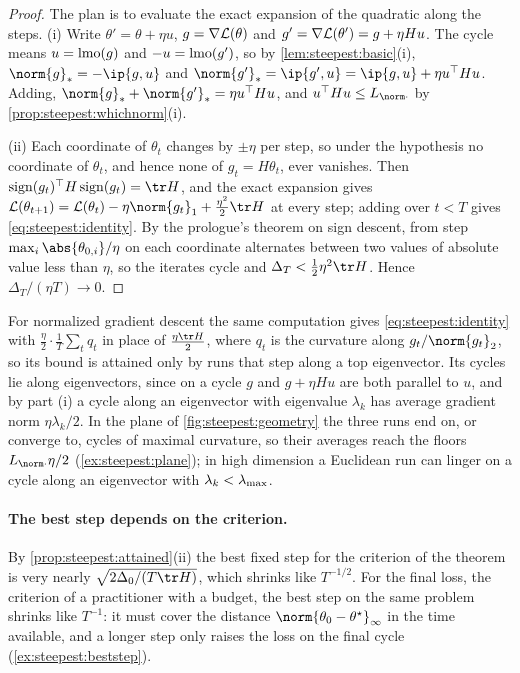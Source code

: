 \begin{refsection}
\begin{proof}
The plan is to evaluate the exact expansion of the quadratic along the steps. (i) Write $\theta'=\theta+\eta u$, $g=\nabla\mathcal{L}(\theta)$ and $g'=\nabla\mathcal{L}(\theta')=g+\eta Hu$. The cycle means $u=\operatorname{lmo}(g)$ and $-u=\operatorname{lmo}(g')$, so by \cref{lem:steepest:basic}(i), $\norm{g}_*=-\ip{g,u}$ and $\norm{g'}_*=\ip{g',u}=\ip{g,u}+\eta u^\top Hu$. Adding, $\norm{g}_*+\norm{g'}_*=\eta u^\top Hu$, and $u^\top Hu\le L_{\norm\cdot}$ by \cref{prop:steepest:whichnorm}(i).

(ii) Each coordinate of $\theta_t$ changes by $\pm\eta$ per step, so under the hypothesis no coordinate of $\theta_t$, and hence none of $g_t=H\theta_t$, ever vanishes. Then $\sign(g_t)^\top H\sign(g_t)=\tr H$, and the exact expansion gives $\Loss(\theta_{t+1})=\Loss(\theta_t)-\eta\norm{g_t}_1+\frac{\eta^2}2\tr H$ at every step; adding over $t<T$ gives \eqref{eq:steepest:identity}. By the prologue's theorem on sign descent, from step $\max_i\abs{\theta_{0,i}}/\eta$ on each coordinate alternates between two values of absolute value less than $\eta$, so the iterates cycle and $\Delta_T<\frac12\eta^2\tr H$. Hence $\Delta_T/(\eta T)\to0$.
\end{proof}

For normalized gradient descent the same computation gives \eqref{eq:steepest:identity} with $\frac\eta2\cdot\frac1T\sum_tq_t$ in place of $\frac{\eta\tr H}2$, where $q_t$ is the curvature along $g_t/\norm{g_t}_2$, so its bound is attained only by runs that step along a top eigenvector. Its cycles lie along eigenvectors, since on a cycle $g$ and $g+\eta Hu$ are both parallel to $u$, and by part (i) a cycle along an eigenvector with eigenvalue $\lambda_k$ has average gradient norm $\eta\lambda_k/2$. In the plane of \cref{fig:steepest:geometry} the three runs end on, or converge to, cycles of maximal curvature, so their averages reach the floors $L_{\norm\cdot}\eta/2$ (\cref{ex:steepest:plane}); in high dimension a Euclidean run can linger on a cycle along an eigenvector with $\lambda_k<\lambda_{\max}$.

\paragraph{The best step depends on the criterion.} By \cref{prop:steepest:attained}(ii) the best fixed step for the criterion of the theorem is very nearly $\sqrt{2\Delta_0/(T\tr H)}$, which shrinks like $T^{-1/2}$. For the final loss, the criterion of a practitioner with a budget, the best step on the same problem shrinks like $T^{-1}$: it must cover the distance $\norm{\theta_0-\theta^\star}_\infty$ in the time available, and a longer step only raises the loss on the final cycle (\cref{ex:steepest:beststep}).


\end{refsection}
